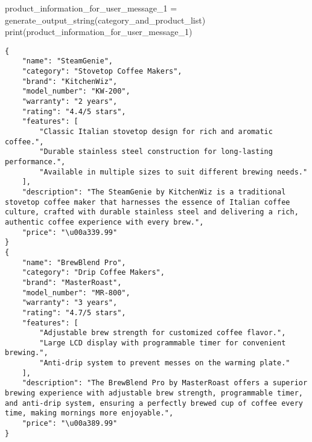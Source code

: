 \documentclass[
  letterpaper,
  DIV=11,
  numbers=noendperiod]{scrreprt}
\newenvironment{Shaded}{\begin{snugshade}}{\end{snugshade}}
\newcommand{\BuiltInTok}[1]{\textcolor[rgb]{0.00,0.23,0.31}{#1}}
\newcommand{\NormalTok}[1]{\textcolor[rgb]{0.00,0.23,0.31}{#1}}
\newcommand{\OperatorTok}[1]{\textcolor[rgb]{0.37,0.37,0.37}{#1}}
\begin{document}
\begin{Shaded}
\begin{Highlighting}[]
\NormalTok{product\_information\_for\_user\_message\_1 }\OperatorTok{=}\NormalTok{ generate\_output\_string(category\_and\_product\_list)}
\BuiltInTok{print}\NormalTok{(product\_information\_for\_user\_message\_1)}
\end{Highlighting}
\end{Shaded}

\begin{verbatim}
{
    "name": "SteamGenie",
    "category": "Stovetop Coffee Makers",
    "brand": "KitchenWiz",
    "model_number": "KW-200",
    "warranty": "2 years",
    "rating": "4.4/5 stars",
    "features": [
        "Classic Italian stovetop design for rich and aromatic coffee.",
        "Durable stainless steel construction for long-lasting performance.",
        "Available in multiple sizes to suit different brewing needs."
    ],
    "description": "The SteamGenie by KitchenWiz is a traditional stovetop coffee maker that harnesses the essence of Italian coffee culture, crafted with durable stainless steel and delivering a rich, authentic coffee experience with every brew.",
    "price": "\u00a339.99"
}
{
    "name": "BrewBlend Pro",
    "category": "Drip Coffee Makers",
    "brand": "MasterRoast",
    "model_number": "MR-800",
    "warranty": "3 years",
    "rating": "4.7/5 stars",
    "features": [
        "Adjustable brew strength for customized coffee flavor.",
        "Large LCD display with programmable timer for convenient brewing.",
        "Anti-drip system to prevent messes on the warming plate."
    ],
    "description": "The BrewBlend Pro by MasterRoast offers a superior brewing experience with adjustable brew strength, programmable timer, and anti-drip system, ensuring a perfectly brewed cup of coffee every time, making mornings more enjoyable.",
    "price": "\u00a389.99"
}
\end{verbatim}
\end{document}
